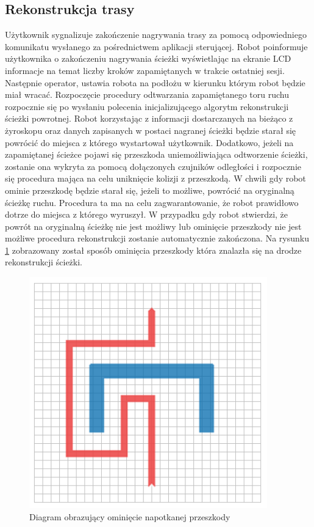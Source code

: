\subsection{Rekonstrukcja trasy}
Użytkownik sygnalizuje zakończenie nagrywania trasy za pomocą odpowiedniego
komunikatu wysłanego za pośrednictwem aplikacji sterującej. Robot
poinformuje użytkownika o zakończeniu nagrywania ścieżki wyświetlając na ekranie
LCD informacje na temat liczby kroków zapamiętanych w trakcie ostatniej sesji.
Następnie operator, ustawia robota na podłożu w kierunku którym robot
będzie miał wracać. Rozpoczęcie procedury odtwarzania zapamiętanego toru ruchu
rozpocznie się po wysłaniu polecenia inicjalizującego algorytm rekonstrukcji
ścieżki powrotnej. Robot korzystając z informacji dostarczanych na bieżąco z
żyroskopu oraz danych zapisanych w postaci nagranej ścieżki będzie starał się
powrócić do miejsca z którego wystartował użytkownik. Dodatkowo, jeżeli na
zapamiętanej ścieżce pojawi się przeszkoda uniemożliwiająca odtworzenie ścieżki,
zostanie ona wykryta za pomocą dołączonych czujników odległości i rozpocznie się
procedura mająca na celu uniknięcie kolizji z przeszkodą. W chwili gdy robot
ominie przeszkodę będzie starał się, jeżeli to możliwe, powrócić na oryginalną
ścieżkę ruchu. Procedura ta ma na celu zagwarantowanie, że robot prawidłowo
dotrze do miejsca z którego wyruszył. W przypadku gdy robot stwierdzi, że powrót
na oryginalną ścieżkę nie jest możliwy lub ominięcie przeszkody nie jest możliwe
procedura rekonstrukcji zostanie automatycznie zakończona. Na rysunku
\ref{fig:rtrwca_avoid_obstacle} zobrazowany został sposób ominięcia przeszkody która znalazła się
na drodze rekonstrukcji ścieżki. 

\begin{figure}[ht!]
 \centering \includegraphics[height=100mm]{../images/ch04/rtrwca1.png}
 \caption{Diagram obrazujący ominięcie napotkanej przeszkody}
 \label{fig:rtrwca_avoid_obstacle}
\end{figure}

